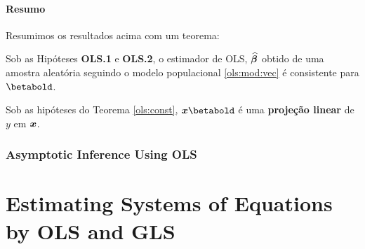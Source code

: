 \documentclass[11pt, oneside, a4paper, article]{article}
\numberwithin{equation}{section}
\begin{document}
\paragraph{Resumo}
Resumimos os resultados acima com um teorema:

\begin{teo1}\label{ols:const}
Sob as Hipóteses \textbf{OLS.1} e \textbf{OLS.2}, o estimador de OLS, $\widehat{\boldsymbol{\beta}}$ obtido de uma amostra aleatória seguindo o modelo populacional \eqref{ols:mod:vec} é consistente para $\betabold$.
\end{teo1}

Sob as hipóteses do Teorema \ref{ols:const}, $\mbs{x} \betabold$ é uma \textbf{projeção linear} de $y$ em $\boldsymbol{x}$.

\subsubsection{Asymptotic Inference Using OLS}
\noindent
\citet[Sec. 4.2.2 -- Asymptotic INference Using OLS; p.54-5]{wool-2010}

\clearpage
\section{Estimating Systems of Equations by OLS and GLS}

\noindent
\citet[C.7,  p.143--179]{wool-2010}\\
\end{document}
